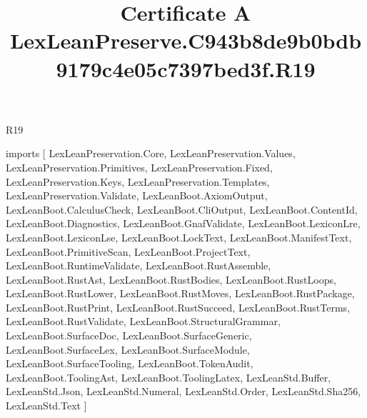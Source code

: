 \begin{lexlean}{R19}
\title{Certificate A LexLeanPreserve.C943b8de9b0bdb9179c4e05c7397bed3f.R19}
\begin{coremodule}
imports [
  LexLeanPreservation.Core,
  LexLeanPreservation.Values,
  LexLeanPreservation.Primitives,
  LexLeanPreservation.Fixed,
  LexLeanPreservation.Keys,
  LexLeanPreservation.Templates,
  LexLeanPreservation.Validate,
  LexLeanBoot.AxiomOutput,
  LexLeanBoot.CalculusCheck,
  LexLeanBoot.CliOutput,
  LexLeanBoot.ContentId,
  LexLeanBoot.Diagnostics,
  LexLeanBoot.GnafValidate,
  LexLeanBoot.LexiconLre,
  LexLeanBoot.LexiconLse,
  LexLeanBoot.LockText,
  LexLeanBoot.ManifestText,
  LexLeanBoot.PrimitiveScan,
  LexLeanBoot.ProjectText,
  LexLeanBoot.RuntimeValidate,
  LexLeanBoot.RustAssemble,
  LexLeanBoot.RustAst,
  LexLeanBoot.RustBodies,
  LexLeanBoot.RustLoops,
  LexLeanBoot.RustLower,
  LexLeanBoot.RustMoves,
  LexLeanBoot.RustPackage,
  LexLeanBoot.RustPrint,
  LexLeanBoot.RustSucceed,
  LexLeanBoot.RustTerms,
  LexLeanBoot.RustValidate,
  LexLeanBoot.StructuralGrammar,
  LexLeanBoot.SurfaceDoc,
  LexLeanBoot.SurfaceGeneric,
  LexLeanBoot.SurfaceLex,
  LexLeanBoot.SurfaceModule,
  LexLeanBoot.SurfaceTooling,
  LexLeanBoot.TokenAudit,
  LexLeanBoot.ToolingAst,
  LexLeanBoot.ToolingLatex,
  LexLeanStd.Buffer,
  LexLeanStd.Json,
  LexLeanStd.Numeral,
  LexLeanStd.Order,
  LexLeanStd.Sha256,
  LexLeanStd.Text
]


\end{coremodule}
\end{lexlean}
